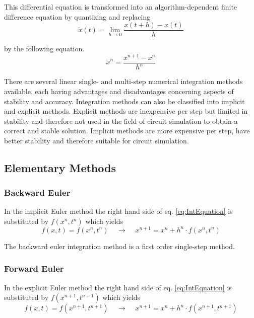 \documentclass[10pt]{report}
\begin{document}
This differential equation is transformed into an algorithm-dependent
finite difference equation by quantizing and replacing
\begin{equation}
\dot{x}(t) = \lim_{h \rightarrow 0} \dfrac{x(t+h) - x(t)}{h}
\end{equation}

by the following equation.
\begin{equation}
\dot{x}^n = \dfrac{x^{n+1} - x^{n}}{h^{n}}
\end{equation}

There are several linear single- and multi-step numerical integration
methods available, each having advantages and disadvantages concerning
aspects of stability and accuracy.  Integration methods can also be
classified into implicit and explicit methods.  Explicit methods are
inexpensive per step but limited in stability and therefore not used
in the field of circuit simulation to obtain a correct and stable
solution.  Implicit methods are more expensive per step, have better
stability and therefore suitable for circuit simulation.

\subsection{Elementary Methods}

\subsubsection{Backward Euler}

In the implicit Euler method the right hand side of
eq. \eqref{eq:IntEquation} is substituted by $f(x^n, t^n)$ which
yields
\begin{equation}
\label{eq:BEInt}
f(x,t) = f(x^n, t^n)
\;\;\;\; \rightarrow \;\;\;\;
x^{n+1} = x^n + h^n\cdot f(x^n, t^n)
\end{equation}

The backward euler integration method is a first order single-step
method.

\subsubsection{Forward Euler}

In the explicit Euler method the right hand side of
eq. \eqref{eq:IntEquation} is substituted by $f(x^{n+1}, t^{n+1})$ which
yields
\begin{equation}
f(x,t) = f(x^{n+1}, t^{n+1})
\;\;\;\; \rightarrow \;\;\;\;
x^{n+1} = x^n + h^n\cdot f(x^{n+1}, t^{n+1})
\end{equation}
\end{document}
